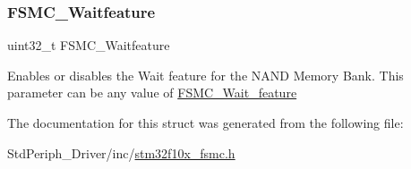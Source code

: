 \subsubsection{\texorpdfstring{FSMC\_Waitfeature}{FSMC\_Waitfeature}}
{\footnotesize\ttfamily uint32\+\_\+t F\+S\+M\+C\+\_\+\+Waitfeature}

Enables or disables the Wait feature for the N\+A\+ND Memory Bank. This parameter can be any value of \mbox{\hyperlink{group___f_s_m_c___wait__feature}{F\+S\+M\+C\+\_\+\+Wait\+\_\+feature}} 

The documentation for this struct was generated from the following file\+:\begin{DoxyCompactItemize}
\item 
Std\+Periph\+\_\+\+Driver/inc/\mbox{\hyperlink{stm32f10x__fsmc_8h}{stm32f10x\+\_\+fsmc.\+h}}\end{DoxyCompactItemize}
